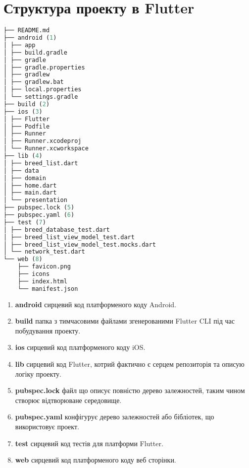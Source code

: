 \section{Структура проекту в Flutter}
\label{section.3.7}

\begin{lstlisting}[style=light, language=Python,label={lst:flutter_project_layout},caption=Flutter Project Layout]
├── README.md
├── android (1)
│ ├── app
│ ├── build.gradle
│ ├── gradle
│ ├── gradle.properties
│ ├── gradlew
│ ├── gradlew.bat
│ ├── local.properties
│ └── settings.gradle
├── build (2)
├── ios (3)
│ ├── Flutter
│ ├── Podfile
│ ├── Runner
│ ├── Runner.xcodeproj
│ └── Runner.xcworkspace
├── lib (4)
│ ├── breed_list.dart
│ ├── data
│ ├── domain
│ ├── home.dart
│ ├── main.dart
│ └── presentation
├── pubspec.lock (5)
├── pubspec.yaml (6)
├── test (7)
│ ├── breed_database_test.dart
│ ├── breed_list_view_model_test.dart
│ ├── breed_list_view_model_test.mocks.dart
│ └── network_test.dart
└── web (8)
    ├── favicon.png
    ├── icons
    ├── index.html
    └── manifest.json
\end{lstlisting}

\begin{enumerate}
    \item \textbf{android} сирцевий код платформеного коду Android.
    \item \textbf{build} папка з тимчасовими файлами згенерованими Flutter CLI під час побудування проекту.
    \item \textbf{ios} сирцевий код платформеного коду iOS.
    \item \textbf{lib} сирцевий код Flutter, котрий фактично є серцем репозиторія та описую логіку проекту.
    \item \textbf{pubspec.lock} файл що описує повністю дерево залежностей, таким чином створює відтворюване середовище.
    \item \textbf{pubspec.yaml} конфігурує дерево залежностей або бібліотек, що використовує проект.
    \item \textbf{test} сирцевий код тестів для платформи Flutter.
    \item \textbf{web} сирцевий код платформеного коду веб сторінки.
\end{enumerate}
